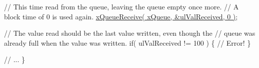 \begin{DoxyPre} // This time read from the queue, leaving the queue empty once more.
 // A block time of 0 is used again.
 \hyperlink{vendor_2ceedling_2plugins_2freertos_2src_2freertos_2include_2queue_8h_af1549eac0e7f05694a59a0b967c80be3}{xQueueReceive( xQueue, &ulValReceived, 0 )};\end{DoxyPre}



\begin{DoxyPre} // The value read should be the last value written, even though the
 // queue was already full when the value was written.
 if( ulValReceived != 100 )
 \{
     // Error!
 \}\end{DoxyPre}



\begin{DoxyPre} // ...
\}
\end{DoxyPre}
 
